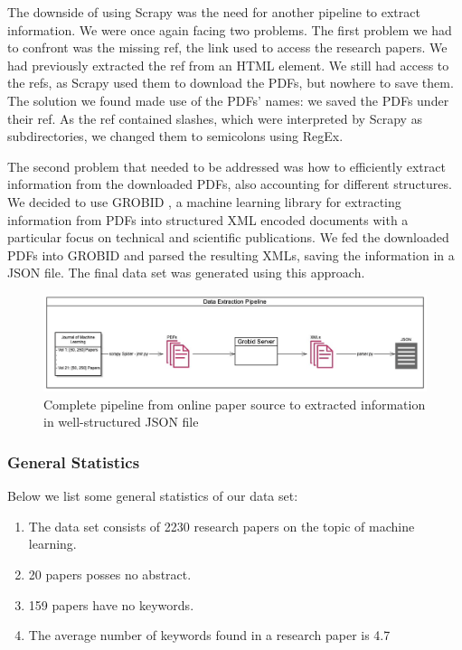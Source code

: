 The downside of using Scrapy \cite{kouzis2016learning} was the need for another pipeline to extract information. We were once again facing two problems. The first problem we had to confront was the missing ref, the link used to access the research papers. We had previously extracted the ref from an HTML element. We still had access to the refs, as Scrapy  \cite{kouzis2016learning}used them to download the PDFs, but nowhere to save them. The solution we found made use of the PDFs' names: we saved the PDFs under their ref. As the ref contained slashes, which were interpreted by Scrapy \cite{kouzis2016learning} as subdirectories, we changed them to semicolons using RegEx.


The second problem that needed to be addressed was how to efficiently extract information from the downloaded PDFs, also accounting for different structures. We decided to use GROBID \cite{GROBID}, a machine learning library for extracting information from PDFs into structured XML encoded documents with a particular focus on technical and scientific publications. We fed the downloaded PDFs into GROBID  \cite{GROBID} and parsed the resulting XMLs, saving the information in a JSON file. The final data set was generated using this approach.


\begin{figure}[h]
    \centering
    \includegraphics[width=1.0\linewidth]{imgs/data_pipeline.png}
    \caption{Complete pipeline from online paper source to extracted information in well-structured JSON file}
    \label{fig:data pipeline}
\end{figure}

\subsubsection{General Statistics}
\subsubcomment{}
Below we list some general statistics of our data set:
\begin{enumerate}
	\item The data set consists of 2230 research papers on the topic of machine learning.
	\item 20 papers posses no abstract.
	\item 159 papers have no keywords.
	\item The average number of keywords found in a research paper is 4.7
\end{enumerate}
